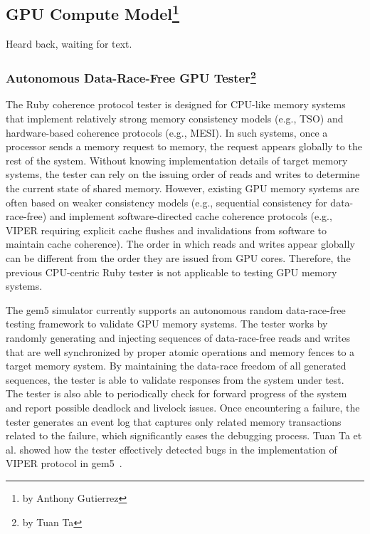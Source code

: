 \subsection[GPU Compute Model]{GPU Compute Model\footnote{by Anthony Gutierrez}}

Heard back, waiting for text.

\subsubsection[Autonomous Data-Race-Free GPU Tester]{Autonomous Data-Race-Free GPU Tester\footnote{by Tuan Ta}}

The Ruby coherence protocol tester is designed for CPU-like memory systems that implement relatively strong memory consistency models (e.g., TSO) and hardware-based coherence protocols (e.g., MESI).
In such systems, once a processor sends a memory request to memory, the request appears globally to the rest of the system.
Without knowing implementation details of target memory systems, the tester can rely on the issuing order of reads and writes to determine the current state of shared memory.
However, existing GPU memory systems are often based on weaker consistency models (e.g., sequential consistency for data-race-free) and implement software-directed cache coherence protocols (e.g., VIPER requiring explicit cache flushes and invalidations from software to maintain cache coherence).
The order in which reads and writes appear globally can be different from the order they are issued from GPU cores.
Therefore, the previous CPU-centric Ruby tester is not applicable to testing GPU memory systems.

The gem5 simulator currently supports an autonomous random data-race-free testing framework to validate GPU memory systems.
The tester works by randomly generating and injecting sequences of data-race-free reads and writes that are well synchronized by proper atomic operations and memory fences to a target memory system.
By maintaining the data-race freedom of all generated sequences, the tester is able to validate responses from the system under test.
The tester is also able to periodically check for forward progress of the system and report possible deadlock and livelock issues.
Once encountering a failure, the tester generates an event log that captures only related memory transactions related to the failure, which significantly eases the debugging process.
Tuan Ta et al. showed how the tester effectively detected bugs in the implementation of VIPER protocol in gem5~\cite{Ta2019gputesting}.
